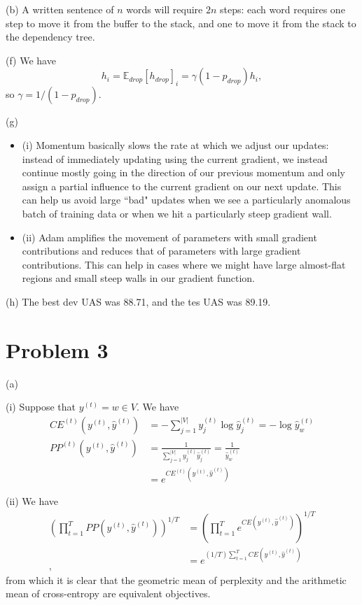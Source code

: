 \documentclass{article}
\begin{document}
(b) A written sentence of $n$ words will require $2n$ steps: each word requires one step to move it from the buffer to the stack, and one to move it from the stack to the dependency tree.

(f) We have
$$ h_i = \mathbb{E}_{drop}[h_{drop}]_i = \gamma (1 - p_{drop}) h_i,$$
so $\gamma = 1/(1 - p_{drop})$.

(g)
\begin{itemize}
\item (i) Momentum basically slows the rate at which we adjust our updates: instead of immediately updating using the current gradient, we instead continue mostly going in the direction of our previous momentum and only assign a partial influence to the current gradient on our next update. This can help us avoid large ``bad" updates when we see a particularly anomalous batch of training data or when we hit a particularly steep gradient wall.
\item (ii) Adam amplifies the movement of parameters with small gradient contributions and reduces that of parameters with large gradient contributions. This can help in cases where we might have large almost-flat regions and small steep walls in our gradient function.
\end{itemize}

(h) The best dev UAS was 88.71, and the tes UAS was 89.19.

\section{Problem 3}
(a)

(i) Suppose that $y^{(t)} = w \in V$. We have
\begin{align*}
CE^{(t)}\left(y^{(t)}, \hat{y}^{(t)}\right) &= -\sum_{j=1}^{|V|} y_j^{(t)}\log \hat{y}_j^{(t)} = -\log \hat{y}_w^{(t)}\\
PP^{(t)}\left(y^{(t)}, \hat{y}^{(t)}\right) &= \frac{1}{\sum_{j=1}^{|V|} y_j^{(t)}\hat{y}_j^{(t)}} = \frac{1}{\hat{y}_w^{(t)}}\\
&= e^{CE^{(t)}\left(y^{(t)}, \hat{y}^{(t)}\right)}
\end{align*}

(ii) We have
\begin{align*}
\left(\prod_{t=1}^T PP\left(y^{(t)}, \hat{y}^{(t)}\right)\right)^{1/T} &= \left(\prod_{t=1}^T e^{CE\left(y^{(t)}, \hat{y}^{(t)}\right)}\right)^{1/T} \\
&= e^{(1/T)\sum_{t=1}^T CE\left(y^{(t)}, \hat{y}^{(t)}\right)} \\,
\end{align*}
from which it is clear that the geometric mean of perplexity and the arithmetic mean of cross-entropy are equivalent objectives.
\end{document}
